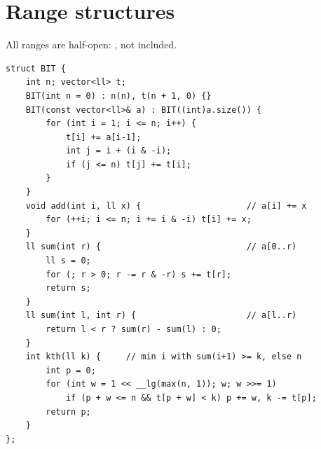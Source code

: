 \section{Range structures}

All ranges are half-open: \code{[l, r)},  not included.


\begin{lstlisting}
struct BIT {
    int n; vector<ll> t;
    BIT(int n = 0) : n(n), t(n + 1, 0) {}
    BIT(const vector<ll>& a) : BIT((int)a.size()) {
        for (int i = 1; i <= n; i++) {
            t[i] += a[i-1];
            int j = i + (i & -i);
            if (j <= n) t[j] += t[i];
        }
    }
    void add(int i, ll x) {                     // a[i] += x
        for (++i; i <= n; i += i & -i) t[i] += x;
    }
    ll sum(int r) {                             // a[0..r)
        ll s = 0;
        for (; r > 0; r -= r & -r) s += t[r];
        return s;
    }
    ll sum(int l, int r) {                      // a[l..r)
        return l < r ? sum(r) - sum(l) : 0;
    }
    int kth(ll k) {     // min i with sum(i+1) >= k, else n
        int p = 0;
        for (int w = 1 << __lg(max(n, 1)); w; w >>= 1)
            if (p + w <= n && t[p + w] < k) p += w, k -= t[p];
        return p;
    }
};
\end{lstlisting}

